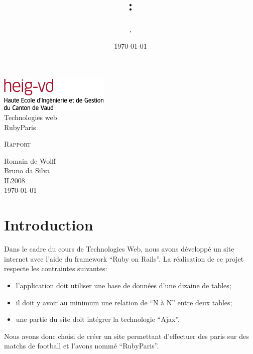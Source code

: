 \documentclass[10pt,a4paper,titlepage]{article}
\author{\auteurOne, \auteurTwo}
\title{\branchetag : \laboname}
\date{\today}
\newcommand{\branche}{Technologies web}
\newcommand{\laboname}{RubyParis}
\newcommand{\auteurOne}{Romain de Wolff}
\newcommand{\auteurTwo}{Bruno da Silva}
\newcommand{\promo}{IL2008}
\begin{document}
\pagestyle{headings}
\begin{titlepage}
	\begin{center}
	\includegraphics{imgs/logo-HEIG-VD.jpg}\\
		\vspace{3cm}
		\LARGE \branche %
		\vspace{3cm}\\
		\Huge \laboname \\
		\vspace{3cm}

		\Large \textsc{Rapport} \\
		\vspace{3cm}

		\large \auteurOne \\
		\auteurTwo \\	
		\vspace{10pt}
		\normalsize \textsc{\promo} \\

		\vspace{2cm}
		\today
	\end{center}
\end{titlepage}

\tableofcontents
\newpage
\pagestyle{fancy}

\section{Introduction}
Dans le cadre du cours de Technologies Web, nous avons développé un site internet avec l'aide du framework “Ruby on Rails”. La réalisation de ce projet respecte les contraintes suivantes: \\
\begin{itemize}
	\item {l'application doit utiliser une base de données d'une dizaine de tables;}
	\item {il doit y avoir au minimum une relation de “N à N” entre deux tables;}
	\item {une partie du site doit intégrer la technologie “Ajax”.\\}
\end{itemize}

Nous avons donc choisi de créer un site permettant d'effectuer des paris sur des matchs de football et l'avons nommé “RubyParis”.
\end{document}
